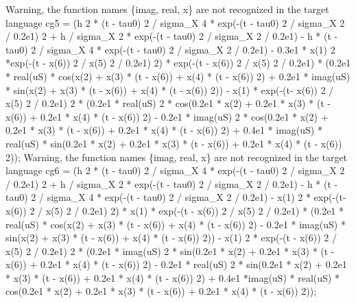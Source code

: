 \begin{maplegroup}
\begin{mapleinput}
\end{mapleinput}
\mapleresult
\underline{}Warning, the function names \{imag, real, x\} are not recognized in the target language\underline{}\mapleresult
cg5 = (h  2 * (t - tau0)  2 / sigma\_X  4 * exp(-(t - tau0)  2 / sigma\_X  2 / 0.2e1)  2 + h / sigma\_X  2 * exp(-(t - tau0)  2 / sigma\_X  2 / 0.2e1) - h * (t - tau0)  2 / sigma\_X  4 * exp(-(t - tau0)  2 / sigma\_X  2 / 0.2e1) - 0.3e1 * x(1)  2 *exp(-(t - x(6))  2 / x(5)  2 / 0.2e1)  2) * exp(-(t - x(6))  2 / x(5)  2 / 0.2e1) * (0.2e1 * real(uS) * cos(x(2) + x(3) * (t - x(6)) + x(4) * (t - x(6))  2) + 0.2e1 * imag(uS) * sin(x(2) + x(3) * (t - x(6)) + x(4) * (t - x(6))  2)) - x(1) * exp(-(t- x(6))  2 / x(5)  2 / 0.2e1)  2 * (0.2e1 * real(uS)  2 * cos(0.2e1 * x(2) + 0.2e1 * x(3) * (t - x(6)) + 0.2e1 * x(4) * (t - x(6))  2) - 0.2e1 * imag(uS)  2 * cos(0.2e1 * x(2) + 0.2e1 * x(3) * (t - x(6)) + 0.2e1 * x(4) * (t - x(6))  2) + 0.4e1 * imag(uS) * real(uS) * sin(0.2e1 * x(2) + 0.2e1 * x(3) * (t - x(6)) + 0.2e1 * x(4) * (t - x(6))  2));
\underline{}Warning, the function names \{imag, real, x\} are not recognized in the target language\underline{}\mapleresult
cg6 = (h  2 * (t - tau0)  2 / sigma\_X  4 * exp(-(t - tau0)  2 / sigma\_X  2 / 0.2e1)  2 + h / sigma\_X  2 * exp(-(t - tau0)  2 / sigma\_X  2 / 0.2e1) - h * (t - tau0)  2 / sigma\_X  4 * exp(-(t - tau0)  2 / sigma\_X  2 / 0.2e1) - x(1)  2 * exp(-(t- x(6))  2 / x(5)  2 / 0.2e1)  2) * x(1) * exp(-(t - x(6))  2 / x(5)  2 / 0.2e1) * (0.2e1 * real(uS) * cos(x(2) + x(3) * (t - x(6)) + x(4) * (t - x(6))  2) - 0.2e1 * imag(uS) * sin(x(2) + x(3) * (t - x(6)) + x(4) * (t - x(6))  2)) - x(1)  2 * exp(-(t - x(6))  2 / x(5)  2 / 0.2e1)  2 * (0.2e1 * imag(uS)  2 * sin(0.2e1 * x(2) + 0.2e1 * x(3) * (t - x(6)) + 0.2e1 * x(4) * (t - x(6))  2) - 0.2e1 * real(uS)  2 * sin(0.2e1 * x(2) + 0.2e1 * x(3) * (t - x(6)) + 0.2e1 * x(4) * (t - x(6))  2) + 0.4e1 *imag(uS) * real(uS) * cos(0.2e1 * x(2) + 0.2e1 * x(3) * (t - x(6)) + 0.2e1 * x(4) * (t - x(6))  2));

\end{maplegroup}
